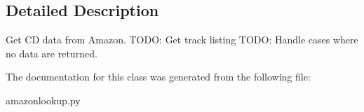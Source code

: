 \subsection{Detailed Description}
\begin{DoxyVerb}Get CD data from Amazon.
TODO: Get track listing
TODO: Handle cases where no data are returned.

\end{DoxyVerb}
 

The documentation for this class was generated from the following file:\begin{DoxyCompactItemize}
\item 
amazonlookup.py\end{DoxyCompactItemize}
